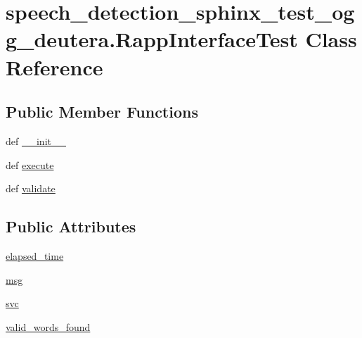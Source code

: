 \hypertarget{classspeech__detection__sphinx__test__ogg__deutera_1_1RappInterfaceTest}{\section{speech\-\_\-detection\-\_\-sphinx\-\_\-test\-\_\-ogg\-\_\-deutera.\-Rapp\-Interface\-Test Class Reference}
\label{classspeech__detection__sphinx__test__ogg__deutera_1_1RappInterfaceTest}
}
\subsection*{Public Member Functions}
\begin{DoxyCompactItemize}
\item 
def \hyperlink{classspeech__detection__sphinx__test__ogg__deutera_1_1RappInterfaceTest_ae2c3fb86fa797ab30903751d8d685683}{\-\_\-\-\_\-init\-\_\-\-\_\-}
\item 
def \hyperlink{classspeech__detection__sphinx__test__ogg__deutera_1_1RappInterfaceTest_ad74b73192bbf1550888a0a55aa7ae64b}{execute}
\item 
def \hyperlink{classspeech__detection__sphinx__test__ogg__deutera_1_1RappInterfaceTest_a8d2d51cfa07eeb30e8adb985fa20a030}{validate}
\end{DoxyCompactItemize}
\subsection*{Public Attributes}
\begin{DoxyCompactItemize}
\item 
\hyperlink{classspeech__detection__sphinx__test__ogg__deutera_1_1RappInterfaceTest_a876679bcc4ed3a4459d014b86f1f16eb}{elapsed\-\_\-time}
\item 
\hyperlink{classspeech__detection__sphinx__test__ogg__deutera_1_1RappInterfaceTest_a341fc01926ff7349fc6b677cd66ad1d4}{msg}
\item 
\hyperlink{classspeech__detection__sphinx__test__ogg__deutera_1_1RappInterfaceTest_ae4e2ddb919628d8af6823a57b204a239}{svc}
\item 
\hyperlink{classspeech__detection__sphinx__test__ogg__deutera_1_1RappInterfaceTest_ad94b8f879ac28451caecb43b85a87f26}{valid\-\_\-words\-\_\-found}
\end{DoxyCompactItemize}


